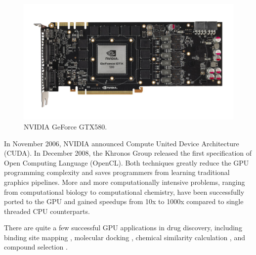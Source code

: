 \begin{figure}
\centering
\includegraphics[width=\textwidth]{Background/Figures/GTX580.jpg}
\caption{NVIDIA GeForce GTX580.}
\label{fig:GTX580}
\end{figure}

In November 2006, NVIDIA announced Compute United Device Architecture (CUDA). In December 2008, the Khronos Group released the first specification of Open Computing Language (OpenCL). Both techniques greatly reduce the GPU programming complexity and saves programmers from learning traditional graphics pipelines. More and more computationally intensive problems, ranging from computational biology to computational chemistry, have been successfully ported to the GPU and gained speedups from 10x to 1000x compared to single threaded CPU counterparts.

There are quite a few successful GPU applications in drug discovery, including binding site mapping \citep{722-2010}, molecular docking \citep{723-2009,652-2010,779-2011}, chemical similarity calculation \citep{726-2010}, and compound selection \citep{750-2011}.

\chapterend
